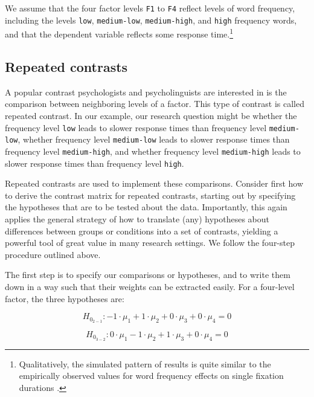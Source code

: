 \documentclass[12pt,]{krantz}
\begin{document}
We assume that the four factor levels \texttt{F1} to \texttt{F4} reflect levels of word frequency, including the levels \texttt{low}, \texttt{medium-low}, \texttt{medium-high}, and \texttt{high} frequency words, and that the dependent variable reflects some response time.\footnote{Qualitatively, the simulated pattern of results is quite similar to the empirically observed values for word frequency effects on single fixation durations \citep{heister2012analysing}.}

\hypertarget{repeatedcontrasts}{%
\subsection{Repeated contrasts}\label{repeatedcontrasts}}

A popular contrast psychologists and psycholinguists are interested in is the comparison between neighboring levels of a factor. This type of contrast is called repeated contrast. In our example, our research question might be whether the frequency level \texttt{low} leads to slower response times than frequency level \texttt{medium-low}, whether frequency level \texttt{medium-low} leads to slower response times than frequency level \texttt{medium-high}, and whether frequency level \texttt{medium-high} leads to slower response times than frequency level \texttt{high}.

Repeated contrasts are used to implement these comparisons. Consider first how to derive the contrast matrix for repeated contrasts, starting out by specifying the hypotheses that are to be tested about the data. Importantly, this again applies the general strategy of how to translate (any) hypotheses about differences between groups or conditions into a set of contrasts, yielding a powerful tool of great value in many research settings. We follow the four-step procedure outlined above.

The first step is to specify our comparisons or hypotheses, and to write them down in a way such that their weights can be extracted easily. For a four-level factor, the three hypotheses are:

\begin{equation}
H_{0_{2-1}}: -1 \cdot \mu_1 + 1 \cdot \mu_2 + 0 \cdot \mu_3 + 0 \cdot \mu_4 = 0
\end{equation}

\begin{equation}
H_{0_{3-2}}: 0 \cdot \mu_1 - 1 \cdot \mu_2 + 1 \cdot \mu_3 + 0 \cdot \mu_4 = 0
\end{equation}
\end{document}
